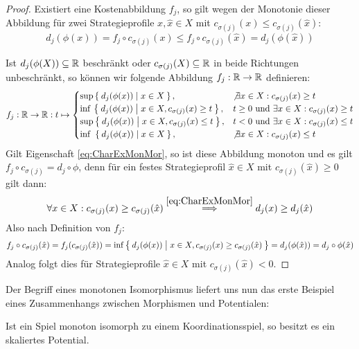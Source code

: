 \begin{proof}
	Existiert eine Kostenabbildung $f_j$, so gilt wegen der Monotonie dieser Abbildung für zwei Strategieprofile $x, \hat{x} \in X$ mit $c_{\sigma(j)}(x) \leq c_{\sigma(j)}(\hat{x})$:
		\[d_j(\phi(x)) = f_j\circ c_{\sigma(j)}(x) \leq f_j\circ c_{\sigma(j)}(\hat{x}) = d_j(\phi(\hat{x}))\]
		
	Ist $d_j(\phi(X)) \subseteq \mathbb{R}$ beschränkt oder $c_{\sigma(j)}(X) \subseteq \mathbb{R}$ in beide Richtungen unbeschränkt, so können wir folgende Abbildung $f_j: \mathbb{R} \to \mathbb{R}$ definieren:
		\[f_j: \mathbb{R} \to \mathbb{R}: t \mapsto \begin{cases}
			\sup \Set{d_j(\phi(x)) | x \in X},								&\not\exists x \in X: c_{\sigma(j)}(x) \geq t \\
			\inf\, \Set{d_j(\phi(x)) | x \in X, c_{\sigma(j)}(x) \geq t}, 	&t \geq 0 \text{ und } \exists x \in X: c_{\sigma(j)}(x) \geq t\\
			\sup \Set{d_j(\phi(x)) | x \in X, c_{\sigma(j)}(x) \leq t}, 	&t <    0 \text{ und } \exists x \in X: c_{\sigma(j)}(x) \leq t\\
			\inf\,\, \Set{d_j(\phi(x)) | x \in X},							&\not\exists x \in X: c_{\sigma(j)}(x) \leq t 
		\end{cases} \]
	Gilt Eigenschaft \eqref{eq:CharExMonMor}, so ist diese Abbildung monoton und es gilt $f_j\circ c_{\sigma(j)} = d_j \circ \phi$, denn für ein festes Strategieprofil $\hat{x} \in X$ mit $c_{\sigma(j)}(\hat{x}) \geq 0$ gilt dann:
		\[\forall x \in X: c_{\sigma(j)}(x) \geq c_{\sigma(j)}(\hat{x}) \overset{\eqref{eq:CharExMonMor}}{\implies} d_j(x) \geq d_j(\hat{x}) \]
	Also nach Definition von $f_j$:
		\[f_j \circ c_{\sigma(j)}(\hat{x}) = f_j (c_{\sigma(j)}(\hat{x})) = \inf\Set{d_j(\phi(x)) | x \in X, c_{\sigma(j)}(x) \geq c_{\sigma(j)}(\hat{x}) }= d_j(\phi(\hat{x})) = d_j\circ \phi(\hat{x})\]
	Analog folgt dies für Strategieprofile $\hat{x} \in X$ mit $c_{\sigma(j)}(\hat{x}) < 0$.
\end{proof}

Der Begriff eines monotonen Isomorphismus liefert uns nun das erste Beispiel eines Zusammenhangs zwischen Morphismen und Potentialen:

\begin{prop}\label{prop:MonIsoKoordDannskPot}
	Ist ein Spiel monoton isomorph zu einem Koordinationsspiel, so besitzt es ein skaliertes Potential.
\end{prop}

